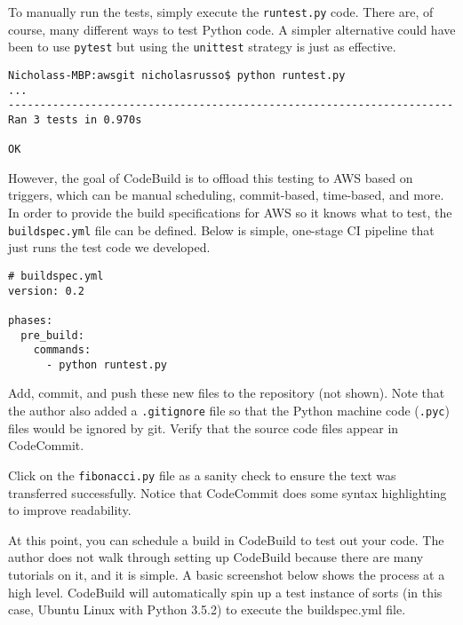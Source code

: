 To manually run the tests, simply execute the \verb|runtest.py| code. There
are, of course, many different ways to test Python code. A simpler alternative
could have been to use \verb|pytest| but using the \verb|unittest| strategy
is just as effective.

\begin{verbatim}
Nicholass-MBP:awsgit nicholasrusso$ python runtest.py
...
----------------------------------------------------------------------
Ran 3 tests in 0.970s

OK
\end{verbatim}

However, the goal of CodeBuild is to offload this testing to AWS based on
triggers, which can be manual scheduling, commit-based, time-based, and more.
In order to provide the build specifications for AWS so it knows what to test,
the \verb|buildspec.yml| file can be defined. Below is simple, one-stage CI pipeline
that just runs the test code we developed.

\begin{verbatim}
# buildspec.yml
version: 0.2

phases:
  pre_build:
    commands:
      - python runtest.py
\end{verbatim}

Add, commit, and push these new files to the repository (not shown). Note that
the author also added a \verb|.gitignore| file so that the Python machine code
(\verb|.pyc|) files would be ignored by git. Verify that the source code files
appear in CodeCommit.


Click on the \verb|fibonacci.py| file as a sanity check to ensure the text was
transferred successfully. Notice that CodeCommit does some syntax highlighting
to improve readability.


At this point, you can schedule a build in CodeBuild to test out your code.
The author does not walk through setting up CodeBuild because there are many
tutorials on it, and it is simple. A basic screenshot below shows the process
at a high level. CodeBuild will automatically spin up a test instance of sorts
(in this case, Ubuntu Linux with Python 3.5.2) to execute the buildspec.yml file.


